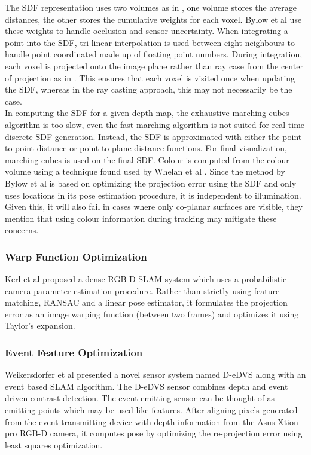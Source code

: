 The SDF representation uses two volumes as in \cite{Curless96Volumetric}, one volume stores the average distances, the other stores the cumulative weights for each voxel. Bylow et al use these weights to handle occlusion and sensor uncertainty. When integrating a point into the SDF, tri-linear interpolation is used between eight neighbours to handle point coordinated made up of floating point numbers. During integration, each voxel is projected onto the image plane rather than ray case from the center of projection as in \cite{Newcombe11Kinectfusion}. This ensures that each voxel is visited once when updating the SDF, whereas in the ray casting approach, this may not necessarily be the case. \\

In computing the SDF for a given depth map, the exhaustive marching cubes algorithm is too slow, even the fast marching algorithm \cite{Baerentzen01Implementation} is not suited for real time discrete SDF generation. Instead, the SDF is approximated with either the point to point distance or point to plane distance functions. For final visualization, marching cubes is used \cite{Lorensen87Marching} on the final SDF. Colour is computed from the colour volume using a technique found used by Whelan et al \cite{Whelan13Robust}. Since the method by Bylow et al is based on optimizing the projection error using the SDF and only uses locations in its pose estimation procedure, it is independent to illumination. Given this, it will also fail in cases where only co-planar surfaces are visible, they mention that using colour information during tracking \cite{Kerl13Robust} may mitigate these concerns.

\subsubsection{Warp Function Optimization} 

Kerl et al \cite{Kerl13Dense} proposed a dense RGB-D SLAM system which uses a probabilistic camera parameter estimation procedure. Rather than strictly using feature matching, RANSAC and a linear pose estimator, it formulates the projection error as an image warping function (between two frames) and optimizes it using Taylor's expansion.

\subsubsection{Event Feature Optimization}

Weikersdorfer et al \cite{Weikersdorfer14Event} presented a novel sensor system named D-eDVS along with an event based SLAM algorithm. The D-eDVS sensor combines depth and event driven contrast detection. The event emitting sensor can be thought of as emitting points which may be used like features. After aligning pixels generated from the event transmitting device with depth information from the Asus Xtion pro RGB-D camera, it computes pose by optimizing the re-projection error using least squares optimization.


